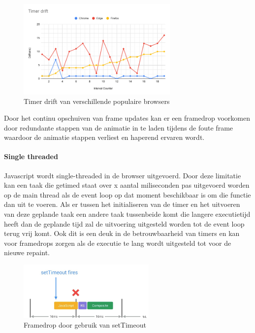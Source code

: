 \begin{figure}[H]
\centering
\includegraphics[width=0.7\textwidth]{img/Timer drift.png}
\caption{Timer drift van verschillende populaire browsers} \label{drift}
\end{figure}

Door het continu opschuiven van frame updates kan er een framedrop voorkomen door redundante stappen van de animatie in te laden tijdens de foute frame waardoor de animatie stappen verliest en haperend ervaren wordt.

\paragraph{Single threaded}
Javascript wordt single-threaded in de browser uitgevoerd. Door deze limitatie kan een taak die getimed staat over x aantal miliseconden pas uitgevoerd worden op de main thread als de event loop op dat moment beschikbaar is om die functie dan uit te voeren. Als er tussen het initialiseren van de timer en het uitvoeren van deze geplande taak een andere taak tussenbeide komt die langere executietijd heeft dan de geplande tijd zal de uitvoering uitgesteld worden tot de event loop terug vrij komt. Ook dit is een deuk in de betrouwbaarheid van timers en kan voor framedrops zorgen als de executie te lang wordt uitgesteld tot voor de nieuwe repaint.

\begin{figure}[H]
	\centering
	\includegraphics[width=0.6\textwidth]{img/drift-framedrop.png}
	\caption{Framedrop door gebruik van setTimeout} \label{drift-framedrop}
\end{figure}

